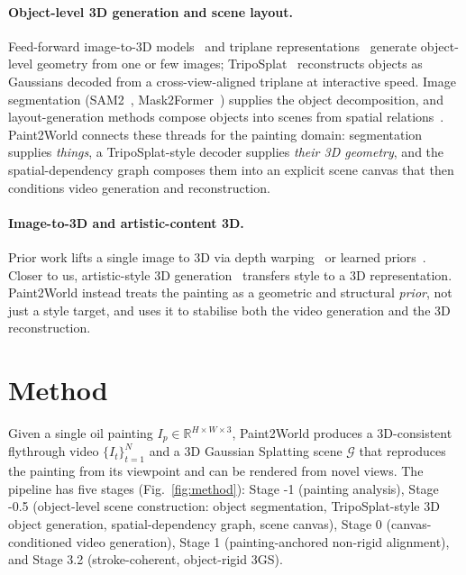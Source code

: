 \documentclass[10pt,twocolumn,letterpaper]{article}
\begin{document}
\paragraph{Object-level 3D generation and scene layout.}
Feed-forward image-to-3D models~\cite{lrm} and triplane
representations~\cite{triplane2021} generate object-level geometry from one
or few images; TripoSplat~\cite{triposplat2025} reconstructs objects as
Gaussians decoded from a cross-view-aligned triplane at interactive speed.
Image segmentation (SAM2~\cite{sam2}, Mask2Former~\cite{mask2former})
supplies the object decomposition, and layout-generation methods compose
objects into scenes from spatial relations~\cite{scenecanvas2024}. Paint2World
connects these threads for the painting domain: segmentation supplies
\emph{things}, a TripoSplat-style decoder supplies \emph{their 3D geometry},
and the spatial-dependency graph composes them into an explicit scene canvas
that then conditions video generation and reconstruction.

\paragraph{Image-to-3D and artistic-content 3D.}
Prior work lifts a single image to 3D via depth
warping~\cite{sin3dgen,deep3dim} or learned priors~\cite{pixel3dmm}. Closer to
us, artistic-style 3D generation~\cite{artistic3d,luciddreamer} transfers
style to a 3D representation. Paint2World instead treats the painting as a
geometric and structural \emph{prior}, not just a style target, and uses it to
stabilise both the video generation and the 3D reconstruction.

\section{Method}
\label{sec:method}

Given a single oil painting $I_p \in \mathbb{R}^{H\times W\times 3}$,
Paint2World produces a 3D-consistent flythrough video
$\{I_t\}_{t=1}^{N}$ and a 3D Gaussian Splatting scene $\mathcal{G}$ that
reproduces the painting from its viewpoint and can be rendered from novel
views. The pipeline has five stages (Fig.~\ref{fig:method}): Stage -1
(painting analysis), Stage -0.5 (object-level scene construction: object
segmentation, TripoSplat-style 3D object generation, spatial-dependency
graph, scene canvas), Stage 0 (canvas-conditioned video generation), Stage 1
(painting-anchored non-rigid alignment), and Stage 3.2 (stroke-coherent,
object-rigid 3GS).
\end{document}
